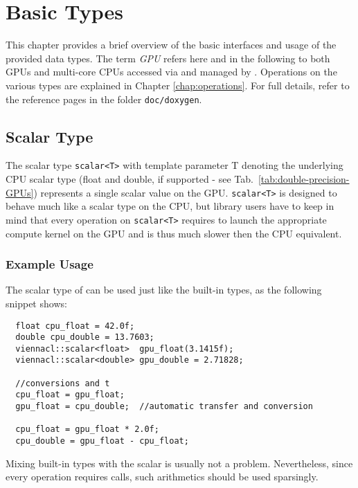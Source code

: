 \chapter{Basic Types}
This chapter provides a brief overview of the basic interfaces and usage of the
provided data types. The term \textit{GPU} refers here and in the following to
both GPUs and multi-core CPUs accessed via {\OpenCL} and managed by
{\ViennaCL}. Operations on the various types are explained in
Chapter \ref{chap:operations}. For full details, refer to the reference pages
in the folder
\texttt{doc/doxygen}.

\section {Scalar Type}
The scalar type \lstinline|scalar<T>| with template parameter T
denoting the underlying CPU scalar type (float and double, if supported - see Tab.~\ref{tab:double-precision-GPUs}) represents a
single scalar value on the GPU. \lstinline|scalar<T>| is designed to behave much
like a scalar type on the CPU, but library users have to keep in mind that
every operation on \lstinline|scalar<T>| requires to launch the appropriate
compute kernel on the GPU and is thus much slower then the CPU equivalent.


\subsection{Example Usage}
The scalar type of {\ViennaCL} can be used just like the built-in
types, as the following snippet shows:
\begin{lstlisting}
  float cpu_float = 42.0f;
  double cpu_double = 13.7603;
  viennacl::scalar<float>  gpu_float(3.1415f);
  viennacl::scalar<double> gpu_double = 2.71828;

  //conversions and t
  cpu_float = gpu_float;  
  gpu_float = cpu_double;  //automatic transfer and conversion

  cpu_float = gpu_float * 2.0f; 
  cpu_double = gpu_float - cpu_float;
\end{lstlisting}
Mixing built-in types with the {\ViennaCL} scalar is usually not a
problem. Nevertheless, since every operation requires {\OpenCL} calls, such
arithmetics should be used sparsingly.

